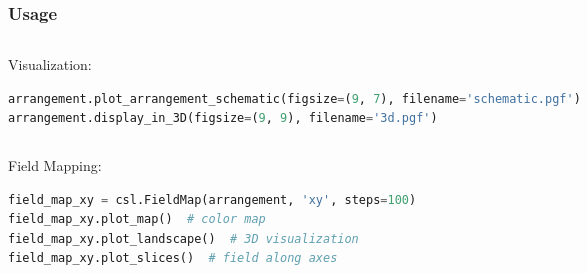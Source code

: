 \begin{frame}[fragile]
    \frametitle{Usage}
    \begin{columns}
        \begin{column}{0.8\textwidth}
            Visualization:
            \begin{lstlisting}[language=Python]
arrangement.plot_arrangement_schematic(figsize=(9, 7), filename='schematic.pgf')
arrangement.display_in_3D(figsize=(9, 9), filename='3d.pgf')
            \end{lstlisting}
        \end{column}
        \begin{column}{0.19\textwidth}
            \begin{figure}
                \centering
                \scalebox{0.3}{
                    \begin{pgfpicture}
                        \pgftext{}
                    \end{pgfpicture}
                }
            \end{figure}
        \end{column}
    \end{columns}

    \pause
    \vspace{0.5cm}
    \begin{columns}
        \begin{column}{0.6\textwidth}
            Field Mapping:
            \begin{lstlisting}[language=Python]
field_map_xy = csl.FieldMap(arrangement, 'xy', steps=100)
field_map_xy.plot_map()  # color map
field_map_xy.plot_landscape()  # 3D visualization
field_map_xy.plot_slices()  # field along axes
            \end{lstlisting}
        \end{column}
        \begin{column}{0.39\textwidth}
        \end{column}
    \end{columns}
\end{frame}

